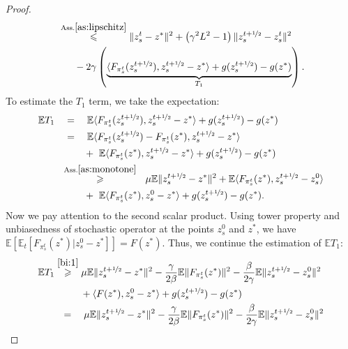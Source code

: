 \documentclass{article}
\begin{document}
\begin{proof}
\begin{align}
            \notag
            &\overset{\text{Ass.} \ref{as:lipschitz}}{\leqslant} \|z_s^t - z^*\|^2 + \left(\gamma^2 L^2 - 1\right) \|z_s^{t+\nicefrac{1}{2}} - z_s^t\|^2 \\
            \label{t1:ineq1}
            &~~~~~ - 2\gamma\left(\underbrace{\langle F_{\pi_s^t}(z_s^{t+\nicefrac{1}{2}}), z_s^{t+\nicefrac{1}{2}} - z^*\rangle + g(z_s^{t+\nicefrac{1}{2}}) - g(z^*)}_{T_1} \right).
        \end{align}
        To estimate the $T_1$ term, we take the expectation:
        \begin{align*}
            \mathbb{E} T_1 & ~~~ = ~~~\mathbb{E}\langle F_{\pi_s^t}(z_s^{t+\nicefrac{1}{2}}), z_s^{t+\nicefrac{1}{2}} - z^*\rangle +  g(z_s^{t+\nicefrac{1}{2}}) -  g(z^*) \\
            &~~~= ~~~\mathbb{E} \langle F_{\pi_s^t}(z_s^{t+\nicefrac{1}{2}}) - F_{\pi_s^t}(z^*), z_s^{t+\nicefrac{1}{2}} - z^*\rangle \\
            & ~~~ \quad\quad + ~\mathbb{E}\langle F_{\pi_s^t}(z^*), z_s^{t+\nicefrac{1}{2}} - z^*\rangle + g(z_s^{t+\nicefrac{1}{2}}) -g(z^*)\\
            &~~\overset{\text{Ass.} \ref{as:monotone}}{\geqslant} ~~\mu \mathbb{E} \|z_s^{t+\nicefrac{1}{2}} - z^*\|^2 + \mathbb{E} \langle F_{\pi_s^t}(z^*), z_s^{t+\nicefrac{1}{2}} - z_s^0\rangle \\
            & ~~~ \quad\quad + ~ \mathbb{E} \langle F_{\pi_s^t}(z^*), z_s^0 - z^*\rangle + g(z_s^{t+\nicefrac{1}{2}}) - g(z^*).
        \end{align*}
        Now we pay attention to the second scalar product. Using tower property and unbiasedness of stochastic operator at the points $z_s^0$ and $z^*$, we have $\mathbb E\left[\mathbb E_t\left[F_{\pi_s^t}(z^*)|z_s^0 - z^*\right]\right] = F(z^*)$. Thus, we continue the estimation of $\mathbb E T_1$:
        \begin{align*}
            \mathbb{E} T_1 &\overset{\eqref{bi:1}}{\geqslant} \mu \mathbb{E} \|z_s^{t+\nicefrac{1}{2}} - z^*\|^2 -  \frac{\gamma}{2\beta}\mathbb{E}\|F_{\pi_s^t}(z^*)\|^2 -  \frac{\beta}{2\gamma}\mathbb{E}\|z_s^{t+\nicefrac{1}{2}} - z_s^0\|^2 \\
            &~~ \quad ~~~+  \langle F(z^*), z_s^0 - z^*\rangle + g(z_s^{t+\nicefrac{1}{2}}) - g(z^*) \\
            &~~ = \quad  \mu\mathbb{E}  \|z_s^{t+\nicefrac{1}{2}} - z^*\|^2 - \frac{\gamma}{2\beta}\mathbb{E}\|F_{\pi_s^t}(z^*)\|^2 - \frac{\beta}{2\gamma}\mathbb{E}\|z_s^{t+\nicefrac{1}{2}} - z_s^0\|^2\\

\end{align*}
\end{proof}
\end{document}
